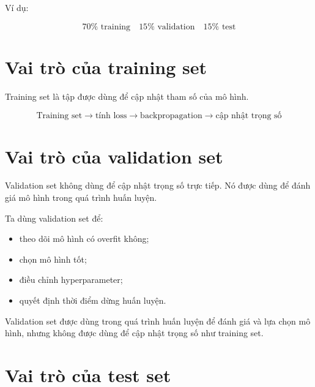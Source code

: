 \documentclass[12pt,a4paper]{report}
\begin{document}
Ví dụ:

\[
    70\% \text{ training}
    \quad
    15\% \text{ validation}
    \quad
    15\% \text{ test}
\]

\begin{center}
\end{center}

\section{Vai trò của training set}

Training set là tập được dùng để cập nhật tham số của mô hình.

\[
    \text{Training set}
    \rightarrow
    \text{tính loss}
    \rightarrow
    \text{backpropagation}
    \rightarrow
    \text{cập nhật trọng số}
\]

\section{Vai trò của validation set}

Validation set không dùng để cập nhật trọng số trực tiếp. Nó được dùng để đánh giá mô hình trong quá trình huấn luyện.

Ta dùng validation set để:

\begin{itemize}
    \item theo dõi mô hình có overfit không;
    \item chọn mô hình tốt;
    \item điều chỉnh hyperparameter;
    \item quyết định thời điểm dừng huấn luyện.
\end{itemize}

\begin{ghinho}
Validation set được dùng trong quá trình huấn luyện để đánh giá và lựa chọn mô hình, nhưng không được dùng để cập nhật trọng số như training set.
\end{ghinho}

\section{Vai trò của test set}
\end{document}
